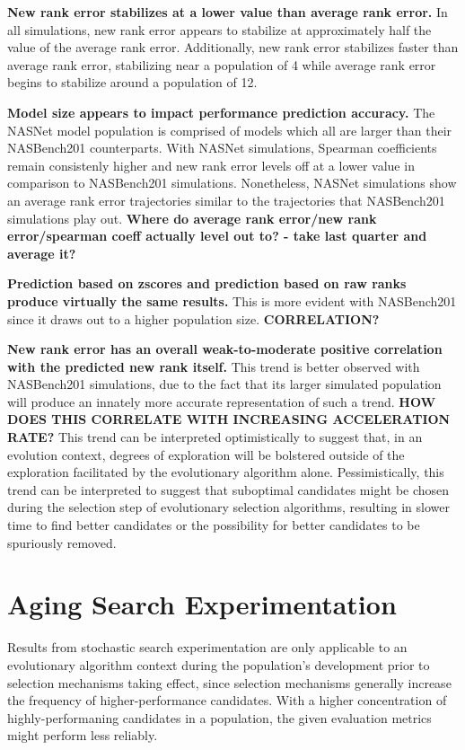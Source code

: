 \documentclass[twocolumn]{article}
\begin{document}
\textbf{New rank error stabilizes at a lower value than average rank error.}
In all simulations, new rank error appears to stabilize at approximately half the value of the average rank error.
Additionally, new rank error stabilizes faster than average rank error, stabilizing near a population of 4 while
average rank error begins to stabilize around a population of 12.

\textbf{Model size appears to impact performance prediction accuracy.} 
The NASNet model population is comprised of models which all are larger than their NASBench201 counterparts.
With NASNet simulations, Spearman coefficients remain consistenly higher and new rank error levels off at a lower value in comparison to NASBench201 simulations.
Nonetheless, NASNet simulations show an average rank error trajectories similar to the trajectories that NASBench201 simulations play out.
\textbf{Where do average rank error/new rank error/spearman coeff actually level out to? - take last quarter and average it?}

\textbf{Prediction based on zscores and prediction based on raw ranks produce virtually the same results.}
This is more evident with NASBench201 since it draws out to a higher population size. 
\textbf{CORRELATION?}

\textbf{New rank error has an overall weak-to-moderate positive correlation with the predicted new rank itself.}
This trend is better observed with NASBench201 simulations, due to the fact that its larger simulated population will produce an innately more accurate
representation of such a trend. 
\textbf{HOW DOES THIS CORRELATE WITH INCREASING ACCELERATION RATE?}
This trend can be interpreted optimistically to suggest that, in an evolution context, degrees of exploration will be bolstered
outside of the exploration facilitated by the evolutionary algorithm alone. 
Pessimistically, this trend can be interpreted to suggest that suboptimal candidates might be chosen during the selection step of
evolutionary selection algorithms, resulting in slower time to find better candidates or the possibility for better candidates
to be spuriously removed.


\section{Aging Search Experimentation}

Results from stochastic search experimentation are only applicable to an evolutionary algorithm context during the population's development prior to 
selection mechanisms taking effect, since selection mechanisms generally increase the frequency of higher-performance candidates. 
With a higher concentration of highly-performaning candidates in a population, the given evaluation metrics might perform less reliably.
\end{document}
